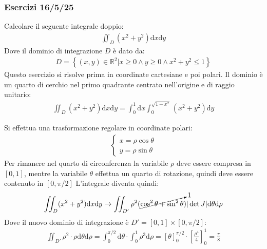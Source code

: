 \documentclass{article}
\newcommand{\df}{\mathrm{d}}
\numberwithin{equation}{subsection}
\begin{document}
\subsubsection*{Esercizi 16/5/25}

Calcolare il seguente integrale doppio:
\begin{gather*}
    \iint_D(x^2+y^2)\df x\df y
\end{gather*}
Dove il dominio di integrazione $D$ è dato da:
\begin{gather*}
    D=\left\{(x,y)\in\mathbb{R}^2\big|x\geq0\land y\geq0\land x^2+y^2\leq 1\right\}
\end{gather*}
Questo esercizio si risolve prima in coordinate cartesiane e poi polari. Il dominio è un quarto di cerchio nel primo quadrante centrato nell'origine e di raggio unitario:
\begin{gather*}
    \iint_D(x^2+y^2)\df x\df y=\int_0^1\df x\int_0^{\sqrt{1-x^2}}(x^2+y^2)\df y
\end{gather*}

Si effettua una trasformazione regolare in coordinate polari:
\begin{gather*}
    \begin{cases}
        x=\rho\cos\theta\\
        y=\rho\sin\theta
    \end{cases}
\end{gather*}
Per rimanere nel quarto di circonferenza la variabile $\rho$ deve essere compresa in $[0,1]$, mentre la variabile $\theta$ effettua un quarto di rotazione, quindi deve essere contenuto in $[0,\pi/2]$ 
L'integrale diventa quindi:
\begin{gather*}
    \iint_D(x^2+y^2)\df x\df y\to
    \iint_{D'}\rho^2(\cancelto{1}{\cos^2\theta+\sin^2\theta})|\det J|\df\theta\df\rho
\end{gather*}
Dove il nuovo dominio di integrazione è $D'=[0,1]\times[0,\pi/2]$: %
\begin{gather*}
    \iint_{D'}\rho^2\cdot\rho\df\theta\df\rho=\int_0^{\pi/2}\df\theta\cdot\int_0^{1}\rho^3\df\rho=
    \left[\theta\right]_0^{\pi/2}\cdot\left[\frac{\rho^4}{4}\right]_0^{1}=\frac{\pi}{8}
\end{gather*}
\end{document}

